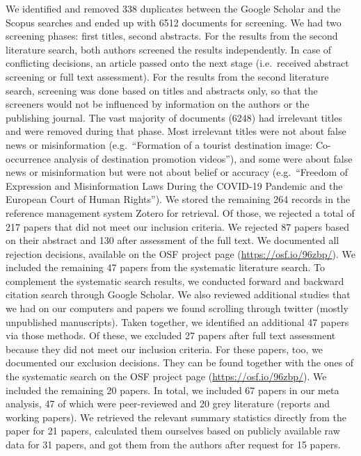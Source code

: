 \documentclass[
  man]{apa6}
\begin{document}
We identified and removed 338 duplicates between the Google Scholar and the Scopus searches and ended up with 6512 documents for screening. We had two screening phases: first titles, second abstracts. For the results from the second literature search, both authors screened the results independently. In case of conflicting decisions, an article passed onto the next stage (i.e.~received abstract screening or full text assessment). For the results from the second literature search, screening was done based on titles and abstracts only, so that the screeners would not be influenced by information on the authors or the publishing journal. The vast majority of documents (6248) had irrelevant titles and were removed during that phase. Most irrelevant titles were not about false news or misinformation (e.g.~``Formation of a tourist destination image: Co-occurrence analysis of destination promotion videos''), and some were about false news or misinformation but were not about belief or accuracy (e.g.~``Freedom of Expression and Misinformation Laws During the COVID-19 Pandemic and the European Court of Human Rights''). We stored the remaining 264 records in the reference management system Zotero for retrieval. Of those, we rejected a total of 217 papers that did not meet our inclusion criteria. We rejected 87 papers based on their abstract and 130 after assessment of the full text. We documented all rejection decisions, available on the OSF project page (\url{https://osf.io/96zbp/}). We included the remaining 47 papers from the systematic literature search. To complement the systematic search results, we conducted forward and backward citation search through Google Scholar. We also reviewed additional studies that we had on our computers and papers we found scrolling through twitter (mostly unpublished manuscripts). Taken together, we identified an additional 47 papers via those methods. Of these, we excluded 27 papers after full text assessment because they did not meet our inclusion criteria. For these papers, too, we documented our exclusion decisions. They can be found together with the ones of the systematic search on the OSF project page (\url{https://osf.io/96zbp/}). We included the remaining 20 papers. In total, we included 67 papers in our meta analysis, 47 of which were peer-reviewed and 20 grey literature (reports and working papers). We retrieved the relevant summary statistics directly from the paper for 21 papers, calculated them ourselves based on publicly available raw data for 31 papers, and got them from the authors after request for 15 papers.
\end{document}
